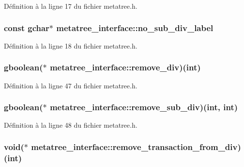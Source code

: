 Définition à la ligne 17 du fichier metatree.h.

\subsubsection[{no\_\-sub\_\-div\_\-label}]{\setlength{\rightskip}{0pt plus 5cm}const gchar$\ast$ {\bf metatree\_\-interface::no\_\-sub\_\-div\_\-label}}\label{structmetatree__interface_a92da245dbce813893cf92f748e662734}


Définition à la ligne 18 du fichier metatree.h.

\subsubsection[{remove\_\-div}]{\setlength{\rightskip}{0pt plus 5cm}gboolean($\ast$  {\bf metatree\_\-interface::remove\_\-div})(int)}\label{structmetatree__interface_a6a09c3389c0f3b80e23addfdafca27a5}


Définition à la ligne 47 du fichier metatree.h.

\subsubsection[{remove\_\-sub\_\-div}]{\setlength{\rightskip}{0pt plus 5cm}gboolean($\ast$  {\bf metatree\_\-interface::remove\_\-sub\_\-div})(int, int)}\label{structmetatree__interface_ac69d8fde7f6e5e99923ab2848e9149f6}


Définition à la ligne 48 du fichier metatree.h.

\subsubsection[{remove\_\-transaction\_\-from\_\-div}]{\setlength{\rightskip}{0pt plus 5cm}void($\ast$  {\bf metatree\_\-interface::remove\_\-transaction\_\-from\_\-div})(int)}\label{structmetatree__interface_ab4ed1f3d2bd093b428069f724e605022}


